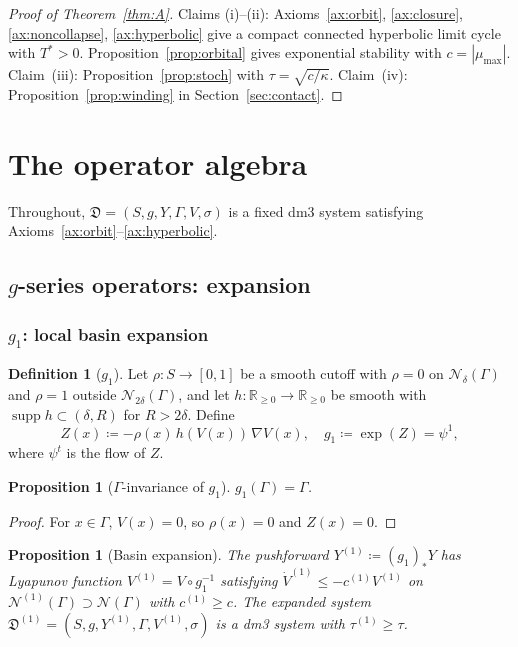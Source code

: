 \documentclass[12pt, oneside]{book}
\theoremstyle{plain}
\newtheorem{proposition}[theorem]{Proposition}
\theoremstyle{definition}
\newtheorem{definition}{Definition}[section]
\theoremstyle{remark}
\newcommand{\R}{\mathbb{R}}
\newcommand{\dm}{\mathfrak{D}}
\newcommand{\Orb}{\Gamma}
\newcommand{\cN}{\mathcal{N}}
\newcommand{\abs}[1]{\left|#1\right|}
\DeclareMathOperator{\supp}{supp}
\begin{document}
\begin{proof}[Proof of Theorem~\ref{thm:A}]
Claims (i)--(ii): Axioms~\ref{ax:orbit}, \ref{ax:closure},
\ref{ax:noncollapse}, \ref{ax:hyperbolic} give a compact connected
hyperbolic limit cycle with $T^*>0$. Proposition~\ref{prop:orbital}
gives exponential stability with $c=\abs{\mu_{\max}}$.
Claim~(iii): Proposition~\ref{prop:stoch} with $\tau=\sqrt{c/\kappa}$.
Claim~(iv): Proposition~\ref{prop:winding} in
Section~\ref{sec:contact}.
\end{proof}

\section{The operator algebra}\label{sec:operators}

Throughout, $\dm=(S,g,Y,\Orb,V,\sigma)$ is a fixed dm3 system
satisfying Axioms~\ref{ax:orbit}--\ref{ax:hyperbolic}.

\subsection{\texorpdfstring{$g$}{g}-series operators: expansion}
\label{subsec:g}

\subsubsection{\texorpdfstring{$g_1$}{g1}: local basin expansion}

\begin{definition}[$g_1$]\label{def:g1}
Let $\rho\colon S\to[0,1]$ be a smooth cutoff with $\rho=0$ on
$\cN_\delta(\Orb)$ and $\rho=1$ outside $\cN_{2\delta}(\Orb)$,
and let $h\colon\R_{\ge 0}\to\R_{\ge 0}$ be smooth with
$\supp h\subset(\delta,R)$ for $R>2\delta$. Define
\[
  Z(x)\coloneqq -\rho(x)\,h(V(x))\,\nabla V(x),\quad
  g_1\coloneqq\exp(Z)=\psi^1,
\]
where $\psi^t$ is the flow of $Z$.
\end{definition}

\begin{proposition}[$\Orb$-invariance of $g_1$]\label{prop:g1inv}
$g_1(\Orb)=\Orb$.
\end{proposition}
\begin{proof}
For $x\in\Orb$, $V(x)=0$, so $\rho(x)=0$ and $Z(x)=0$.
\end{proof}

\begin{proposition}[Basin expansion]\label{prop:g1expand}
The pushforward $Y^{(1)}\coloneqq(g_1)_*Y$ has Lyapunov function
$V^{(1)}=V\circ g_1^{-1}$ satisfying $\dot V^{(1)}\le -c^{(1)}V^{(1)}$
on $\cN^{(1)}(\Orb)\supset\cN(\Orb)$ with $c^{(1)}\ge c$.
The expanded system $\dm^{(1)}=(S,g,Y^{(1)},\Orb,V^{(1)},\sigma)$
is a dm3 system with $\tau^{(1)}\ge\tau$.
\end{proposition}
\end{document}
